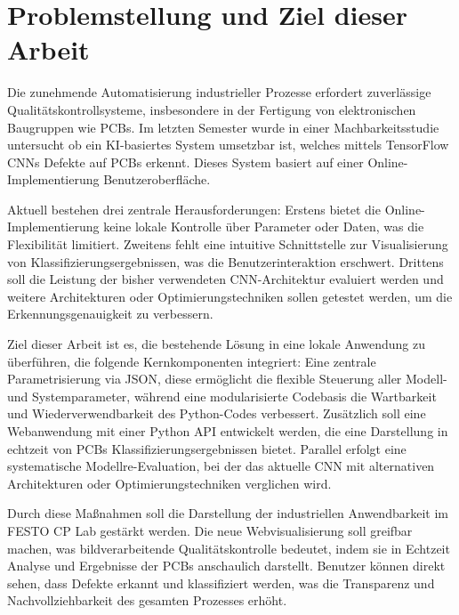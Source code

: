 \chapter{Problemstellung und Ziel dieser Arbeit} \label{sec:problemstellung_und_ziel_dieser_arbeit}

Die zunehmende Automatisierung industrieller Prozesse erfordert zuverlässige Qualitätskontrollsysteme, insbesondere in der Fertigung von elektronischen Baugruppen wie \acp{PCB}. Im letzten Semester wurde in einer Machbarkeitsstudie untersucht ob ein KI-basiertes System umsetzbar ist, welches mittels TensorFlow \acp{CNN} 
Defekte auf \acp{PCB} erkennt. Dieses System basiert auf einer Online-Implementierung Benutzeroberfläche. 

Aktuell bestehen drei zentrale Herausforderungen: Erstens bietet die Online- Implementierung keine lokale Kontrolle über Parameter oder Daten, was die Flexibilität limitiert. Zweitens fehlt eine intuitive Schnittstelle zur Visualisierung von 
Klassifizierungsergebnissen, was die Benutzerinteraktion erschwert. Drittens soll die Leistung der bisher verwendeten \ac{CNN}-Architektur evaluiert werden und weitere Architekturen oder Optimierungstechniken sollen getestet werden, um die
Erkennungsgenauigkeit zu verbessern.  

Ziel dieser Arbeit ist es, die bestehende Lösung in eine lokale Anwendung zu überführen, die folgende Kernkomponenten integriert: Eine zentrale Parametrisierung via JSON, diese ermöglicht die flexible Steuerung aller Modell- und Systemparameter, während eine 
modularisierte Codebasis die Wartbarkeit und Wiederverwendbarkeit des Python-Codes verbessert. Zusätzlich soll eine Webanwendung mit einer Python \ac{API} entwickelt werden, die eine Darstellung in echtzeit von \acp{PCB} Klassifizierungsergebnissen bietet. 
Parallel erfolgt eine systematische Modellre-Evaluation, bei der das aktuelle \ac{CNN} mit alternativen Architekturen oder Optimierungstechniken verglichen wird.

Durch diese Maßnahmen soll die Darstellung der industriellen Anwendbarkeit im FESTO CP Lab gestärkt werden. Die neue Webvisualisierung soll greifbar machen, was bildverarbeitende Qualitätskontrolle bedeutet, indem sie in Echtzeit Analyse und Ergebnisse der \acp{PCB} anschaulich darstellt. Benutzer können direkt sehen, dass Defekte erkannt und klassifiziert werden, was die Transparenz und Nachvollziehbarkeit des gesamten Prozesses erhöht.